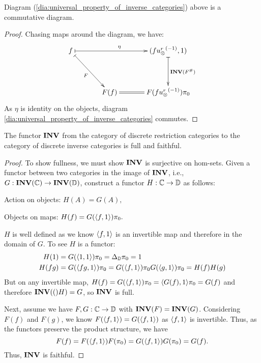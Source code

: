 \begin{lemma}\label{lem:universal_diagram_is_a_commutative_diagram}
  Diagram (\ref{dia:universal_property_of_inverse_categories}) above is a commutative diagram.

\end{lemma}
\begin{proof}
  Chasing maps around the diagram, we have:
  \[
    \xymatrix @C=35pt @R=40pt{
      f \ar@{|->}[rr]^{\eta} \ar@{|->}[rd]_{F}&& (f\inv{\usr},1) \ar@{|->}[d]^{\Inv{F^{\#}}}\\
      &F(f) \ar@{=}[r] & F(f\inv{\usr})\pi_0
    }
  \]
  As $\eta$ is identity on the objects, diagram \vref{dia:universal_property_of_inverse_categories}
  commutes.
\end{proof}

\begin{lemma}\label{lem:inv_is_full_and_faithful}
  The functor $\mathbf{INV}$ from the category of discrete restriction categories to the category of
  discrete inverse categories is full and faithful.
\end{lemma}
\begin{proof}
  To show fullness, we must show $\mathbf{INV}$ is surjective on hom-sets. Given a functor between two
  categories in the image of $\mathbf{INV}$, i.e., $G:\mathbf{INV}({\mathbb{C}})\to \mathbf{INV}({\mathbb{D}})$, construct a functor
  $H:\mathbb{C}\to\mathbb{D}$ as follows:
  \begin{description}
    \item{Action on objects:} $H(A) = G(A),$
    \item{Objects on maps:} $H(f) = G(\langle f,1\rangle)\pi_0.$
  \end{description}
  $H$ is well defined as we know $\langle f,1\rangle$ is an invertible map and therefore in the domain of $G$.
  To see $H$ is a functor:
  \begin{align*}
    H(1) &= G(\langle1,1\rangle)\pi_0 = \Delta_{\mathbb{D}}\pi_0 = 1\\
    H(fg) &= G(\langle fg,1\rangle)\pi_0 = G(\langle f,1\rangle)\pi_0G(\langle g,1\rangle)\pi_0 = H(f)H(g)
  \end{align*}
  But on any invertible map, $H(f) = G(\langle f,1\rangle)\pi_0 = \langle G(f),1\rangle\pi_0 = G(f)$ and therefore
  $\mathbf{INV}({(}) H) = G$, so $\mathbf{INV}$ is full.

  Next, assume we have $F,G:\mathbb{C}\to\mathbb{D}$ with $\mathbf{INV}({F}) = \mathbf{INV}({G})$. Considering $F(f)$ and $F(g)$, we
  know $F(\langle f,1\rangle) = G(\langle f,1\rangle) $ as $\langle f,1\rangle$ is invertible. Thus, as the functors preserve the
  product structure, we have
  \[
    F(f) = F(\langle f,1\rangle)F(\pi_0)= G(\langle f,1\rangle)G(\pi_0)= G(f).
  \]
  Thus, $\mathbf{INV}$ is faithful.
\end{proof}

